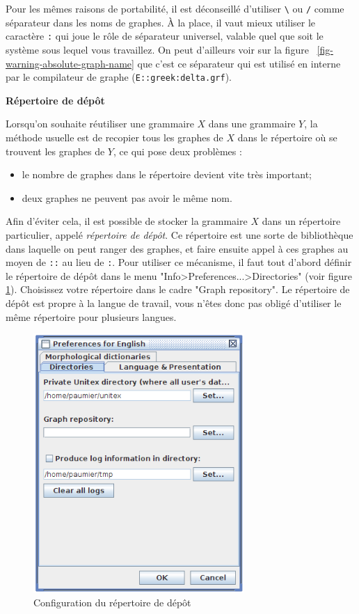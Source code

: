 \bigskip
\noindent Pour les mêmes raisons de portabilité, il est déconseillé d’utiliser \verb+\+
ou \verb+/+ comme séparateur dans les noms de graphes. À la place, il vaut mieux utiliser
le caractère \verb+:+ qui joue le rôle de séparateur universel, valable quel que soit le système 
sous lequel vous travaillez. On peut d’ailleurs voir sur la figure
~\ref{fig-warning-absolute-graph-name}
que c’est ce séparateur qui est utilisé en interne par le compilateur de graphe
(\verb+E::greek:delta.grf+).

\bigskip
\noindent \textbf{Répertoire de dépôt}
\label{section-repository}

\bigskip
\noindent Lorsqu’on souhaite réutiliser une grammaire $X$ dans une grammaire $Y$, la méthode
usuelle est de recopier tous les graphes de $X$ dans le répertoire où se trouvent les graphes
de $Y$, ce qui pose deux problèmes :

\begin{itemize}
  \item le nombre de graphes dans le répertoire devient vite très important;
  \item deux graphes ne peuvent pas avoir le même nom.
\end{itemize}

\bigskip
\noindent Afin d’éviter cela, il est possible de stocker la grammaire $X$ dans un répertoire
particulier, appelé \textit{répertoire de dépôt}. Ce répertoire est
une sorte de bibliothèque dans laquelle on peut ranger des graphes, et faire ensuite appel
à ces graphes au moyen de \verb+::+  au lieu de \verb+:+. Pour utiliser ce mécanisme, il faut tout
d’abord définir le répertoire de dépôt dans le menu "Info>Preferences...>Directories" (voir figure
	\ref{directories}).
Choisissez votre répertoire dans le cadre "Graph repository". Le répertoire de dépôt est propre
à la langue de travail, vous n’êtes donc pas obligé d’utiliser le même répertoire pour plusieurs
langues.


\begin{figure}[!h]
\begin{center}
\includegraphics[width=8cm]{resources/img/fig5-10.png}
\caption{Configuration du répertoire de dépôt\label{directories}}
\end{center}
\end{figure}

